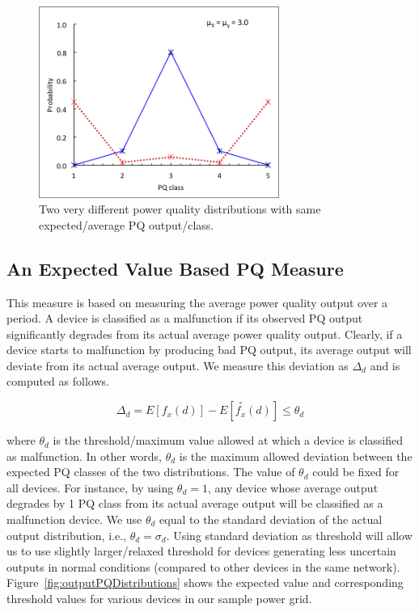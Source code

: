 \begin{figure}[!p]
\centering
\includegraphics[width=0.7\textwidth]{average_pq_exception}
\caption{Two very different power quality distributions with same expected/average PQ output/class.}
\label{fig:average_pq_exception}
\end{figure}

\subsection{An Expected Value Based PQ Measure}
This measure is based on measuring the average power quality output over a period. A device is classified as a malfunction if its observed PQ output significantly degrades from its actual average power quality output. Clearly, if a device starts to malfunction by producing bad PQ output, its average output will deviate from its actual average output. We measure this deviation as $\Delta_d$ and is computed as follows.

\[\Delta_d = E[f_x(d)] - E[\overset{\circ}{f_x}(d)] \leq \theta_d \]

\noindent where $\theta_d$ is the threshold/maximum value allowed at which a device is classified as malfunction. In other words, $\theta_d$ is the maximum allowed deviation between the expected PQ classes of the two distributions. The value of $\theta_d$ could be fixed for all devices. For instance, by using $\theta_d = 1$, any device whose average output degrades by 1 PQ class from its actual average output will be classified as a malfunction device. We use $\theta_d$ equal to the standard deviation of the actual output distribution, i.e., $\theta_d=\sigma_d$. Using standard deviation as threshold will allow us to use slightly larger/relaxed threshold for devices generating less uncertain outputs in normal conditions (compared to other devices in the same network). Figure~\ref{fig:outputPQDistributions} shows the expected value and corresponding threshold values for various devices in our sample power grid.


